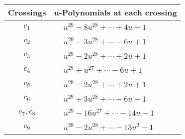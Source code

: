 \documentclass[1p]{elsarticle_modified}
\theoremstyle{definition}
\begin{document}
\begin{tabular}{m{50pt}|m{274pt}}
Crossings & \hspace{64pt}u-Polynomials at each crossing \\
\hline $$\begin{aligned}c_{1}\end{aligned}$$&$\begin{aligned}
&u^{29}-8 u^{28}+\cdots+4 u-1
\end{aligned}$\\
\hline $$\begin{aligned}c_{2}\end{aligned}$$&$\begin{aligned}
&u^{29}-3 u^{28}+\cdots-6 u+1
\end{aligned}$\\
\hline $$\begin{aligned}c_{3}\end{aligned}$$&$\begin{aligned}
&u^{29}-2 u^{28}+\cdots+2 u+1
\end{aligned}$\\
\hline $$\begin{aligned}c_{4}\end{aligned}$$&$\begin{aligned}
&u^{29}+u^{27}+\cdots-6 u+1
\end{aligned}$\\
\hline $$\begin{aligned}c_{5}\end{aligned}$$&$\begin{aligned}
&u^{29}-2 u^{28}+\cdots+2 u+1
\end{aligned}$\\
\hline $$\begin{aligned}c_{6}\end{aligned}$$&$\begin{aligned}
&u^{29}+3 u^{28}+\cdots-6 u-1
\end{aligned}$\\
\hline $$\begin{aligned}c_{7},c_{8}\end{aligned}$$&$\begin{aligned}
&u^{29}-16 u^{27}+\cdots-14 u-1
\end{aligned}$\\
\hline $$\begin{aligned}c_{9}\end{aligned}$$&$\begin{aligned}
&u^{29}-2 u^{28}+\cdots-13 u^2-1
\end{aligned}$\\

\end{tabular}
\end{document}
